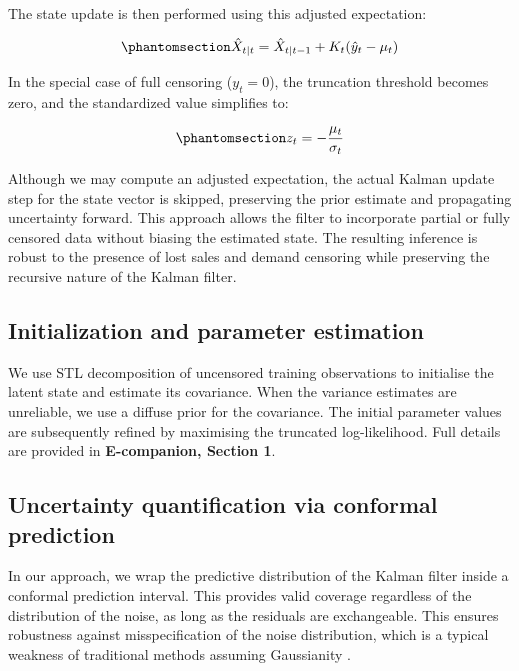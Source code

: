 \documentclass[
  11pt,
  authoryear,
  doubleblind,
  3p]{elsarticle}
\begin{document}
The state update is then performed using this adjusted expectation:

\begin{equation}\phantomsection\label{eq-nine}{
\hat{X}_{t|t} = \hat{X}_{t|t-1} + K_t (\hat{y}_t - \mu_t)
}\end{equation}

In the special case of full censoring (\(y_t = 0\)), the truncation
threshold becomes zero, and the standardized value simplifies to:

\begin{equation}\phantomsection\label{eq-ten}{
z_t = -\frac{\mu_t}{\sigma_t}
}\end{equation}

Although we may compute an adjusted expectation, the actual Kalman
update step for the state vector is skipped, preserving the prior
estimate and propagating uncertainty forward. This approach allows the
filter to incorporate partial or fully censored data without biasing the
estimated state. The resulting inference is robust to the presence of
lost sales and demand censoring while preserving the recursive nature of
the Kalman filter.

\subsection{Initialization and parameter
estimation}\label{initialization-and-parameter-estimation}

We use STL decomposition of uncensored training observations to
initialise the latent state and estimate its covariance. When the
variance estimates are unreliable, we use a diffuse prior for the
covariance. The initial parameter values are subsequently refined by
maximising the truncated log-likelihood. Full details are provided in
\textbf{E-companion, Section 1}.

\subsection{Uncertainty quantification via conformal
prediction}\label{uncertainty-quantification-via-conformal-prediction}

In our approach, we wrap the predictive distribution of the Kalman
filter inside a conformal prediction interval. This provides valid
coverage regardless of the distribution of the noise, as long as the
residuals are exchangeable. This ensures robustness against
misspecification of the noise distribution, which is a typical weakness
of traditional methods assuming Gaussianity \citep{angelopoulos2021}.
\end{document}
